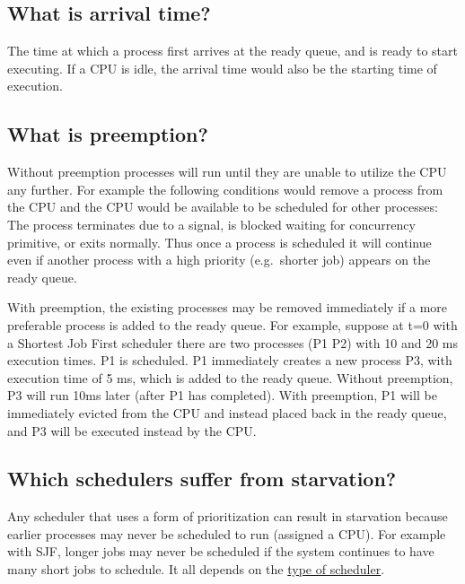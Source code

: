 \subsection{What is arrival time?}\label{what-is-arrival-time}

The time at which a process first arrives at the ready queue, and is
ready to start executing. If a CPU is idle, the arrival time would also
be the starting time of execution.

\subsection{What is preemption?}\label{what-is-preemption}

Without preemption processes will run until they are unable to utilize
the CPU any further. For example the following conditions would remove a
process from the CPU and the CPU would be available to be scheduled for
other processes: The process terminates due to a signal, is blocked
waiting for concurrency primitive, or exits normally. Thus once a
process is scheduled it will continue even if another process with a
high priority (e.g.~shorter job) appears on the ready queue.

With preemption, the existing processes may be removed immediately if a
more preferable process is added to the ready queue. For example,
suppose at t=0 with a Shortest Job First scheduler there are two
processes (P1 P2) with 10 and 20 ms execution times. P1 is scheduled. P1
immediately creates a new process P3, with execution time of 5 ms, which
is added to the ready queue. Without preemption, P3 will run 10ms later
(after P1 has completed). With preemption, P1 will be immediately
evicted from the CPU and instead placed back in the ready queue, and P3
will be executed instead by the CPU.

\subsection{Which schedulers suffer from
starvation?}\label{which-schedulers-suffer-from-starvation}

Any scheduler that uses a form of prioritization can result in
starvation because earlier processes may never be scheduled to run
(assigned a CPU). For example with SJF, longer jobs may never be
scheduled if the system continues to have many short jobs to schedule.
It all depends on the
\href{https://en.wikipedia.org/wiki/Scheduling_(computing)\#Types_of_operating_system_schedulers}{type
of scheduler}.

